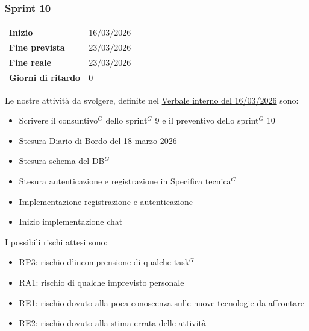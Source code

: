 \subsubsection{Sprint 10}


\begin{tabular}{p{} p{}}
	\textbf{Inizio} & 16/03/2026 \\
	\textbf{Fine prevista} & 23/03/2026 \\
	\textbf{Fine reale} & 23/03/2026 \\
	\textbf{Giorni di ritardo} & 0
\end{tabular}
\newline \newline 
Le nostre attività da svolgere, definite nel \href{https://nullpointersgroup.github.io/Documentazione/output/PB/Verbali%20Interni/2026-03-16_verbale_interno.pdf}{Verbale interno del 16/03/2026} sono:
\begin{itemize}[itemsep=5pt, parsep=1pt, label=$\scriptstyle\bullet$]
	\item Scrivere il consuntivo$^G$ dello sprint$^G$ 9 e il preventivo dello sprint$^G$ 10
	\item Stesura Diario di Bordo del 18 marzo 2026
	\item Stesura schema del DB$^G$
	\item Stesura autenticazione e registrazione in Specifica tecnica$^G$
	\item Implementazione registrazione e autenticazione
	\item Inizio implementazione chat
\end{itemize}

I possibili rischi attesi sono:
\begin{itemize}[itemsep=5pt, parsep=1pt, label=$\scriptstyle\bullet$]
	\item RP3: rischio d'incomprensione di qualche task$^G$
	\item RA1: rischio di qualche imprevisto personale
	\item RE1: rischio dovuto alla poca conoscenza sulle nuove tecnologie da affrontare
	\item RE2: rischio dovuto alla stima errata delle attività
\end{itemize}

